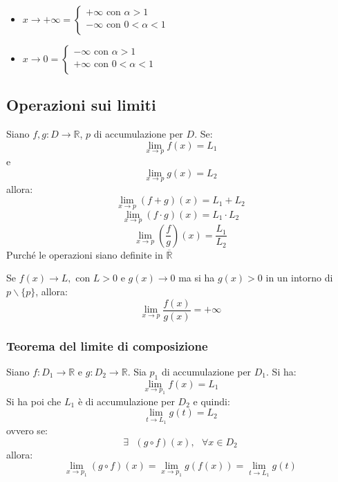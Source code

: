 \documentclass[a4paper,12pt, oneside]{book}
\begin{document}
\begin{shaded}
\begin{nota}
\begin{enumerate}
\begin{itemize}
	\item $x\rightarrow +\infty=\left\{
                \begin{array}{ll}
                +\infty \mbox{ con } \alpha>1 \\
                -\infty \mbox{ con } 0<\alpha<1 \\
				\end{array}
				\right.$
	\item $x\rightarrow 0=\left\{
                \begin{array}{ll}
                -\infty \mbox{ con } \alpha>1 \\
                +\infty \mbox{ con } 0<\alpha<1 \\
				\end{array}
				\right.$
	\end{itemize}
\end{enumerate}
\end{nota}
\end{shaded}
\newpage
\subsection{Operazioni sui limiti}
\begin{teorema}
Siano $f,g:D\rightarrow \mathbb{R}$, $p$ di accumulazione per $D$.
Se:
$$\lim_{x\rightarrow p} f(x)=L_1$$
e 
$$\lim_{x\rightarrow p} g(x)=L_2$$
allora:
$$\lim_{x\rightarrow p} (f+g)(x)=L_1+L_2$$
$$\lim_{x\rightarrow p} (f\cdot g)(x)=L_1\cdot L_2$$
$$\lim_{x\rightarrow p} \left(\frac{f}{g}\right)(x)=\frac{L_1}{L_2}$$
Purché le operazioni siano definite in $\overline{\mathbb{R}}$
\end{teorema}
\begin{osservazione}
Se $f(x)\rightarrow L, \mbox{ con } L>0$ e $ g(x)\rightarrow 0$ ma si ha $g(x)>0$ in un intorno di $p\backslash\{p\}$, allora:
$$\lim_{x\rightarrow p} \frac{f(x)}{g(x)}=+\infty$$
\end{osservazione}
\subsubsection{Teorema del limite di composizione}
\begin{teorema}
Siano $f:D_1\rightarrow \mathbb{R}$ e $g:D_2\rightarrow \mathbb{R}$. Sia $p_1$ di accumulazione per $D_1$. Si ha:
$$\lim_{x\rightarrow p_1} f(x)=L_1$$
Si ha poi che $L_1$ è di accumulazione per $D_2$ e quindi:
$$\lim_{t\rightarrow L_1} g(t)=L_2$$
ovvero se:
$$\exists \mbox{ } (g\circ f)(x), \mbox{ } \forall x\in D_2$$
allora:
$$\lim_{x\rightarrow p_1}(g\circ f)(x)=\lim_{x\rightarrow p_1}g(f(x))=\lim_{t\rightarrow L_1}g(t)$$
\end{teorema}
\end{document}
